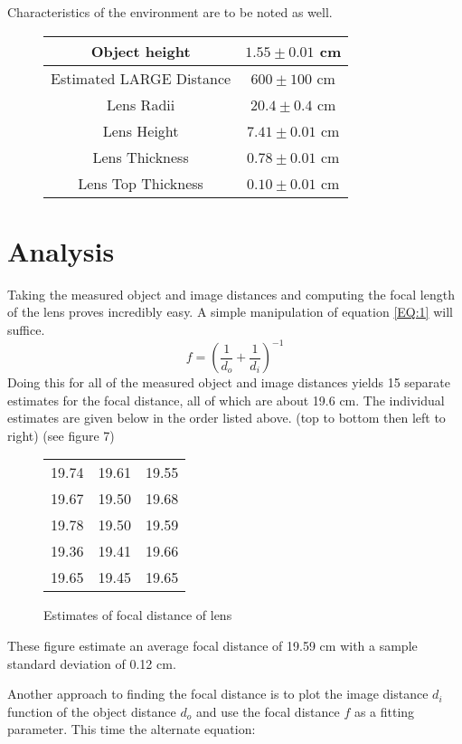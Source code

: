 \documentclass[]{article}
\begin{document}
Characteristics of the environment are to be noted as well.
\begin{figure}[h]
	\centering
	\begin{tabular}{|c|c|}	
		\hline Object height & \(1.55 \pm 0.01\)  cm\\
			\hline Estimated LARGE Distance & \(600 \pm 100\) cm \\ 
				\hline Lens Radii & \(20.4 \pm 0.4\) cm \\ 
					\hline Lens Height & \(7.41 \pm 0.01\) cm \\ 
						\hline Lens Thickness & \(0.78 \pm 0.01\) cm \\
						\hline Lens Top Thickness & \(0.10 \pm 0.01\) cm \\  \hline
						
\end{tabular}
	\end{figure}
\section{Analysis}
Taking the measured object and image distances and computing the focal length of the lens proves incredibly easy. A simple manipulation of equation \eqref{EQ:1} will suffice. 
\begin{equation}
	f = \left( \frac{1}{d_o} + \frac{1}{d_i}\right)^{-1}
\end{equation}
Doing this for all of the measured object and image distances yields 15 separate estimates for the focal distance, all of which are about 19.6 cm. The individual estimates are given below in the order listed above. (top to bottom then left to right) (see figure 7)
\begin{figure}[h]
	\centering
	\caption{Estimates of focal distance of lens}
\begin{tabular}{|c ||| c ||| c |} \hline
	19.74  & 19.61 & 19.55 \\
	19.67  & 19.50 & 19.68 \\
	19.78  & 19.50 & 19.59 \\
	19.36  & 19.41 & 19.66 \\
	19.65  & 19.45 & 19.65 \\ \hline
\end{tabular}
\end{figure}

These figure estimate an average focal distance of 19.59 cm with a sample standard deviation of 0.12 cm.

Another approach to finding the focal distance is to plot the image distance \(d_i\) function of the object distance \(d_o\) and use the focal distance \(f\) as a fitting parameter. This time the alternate equation:
\end{document}
